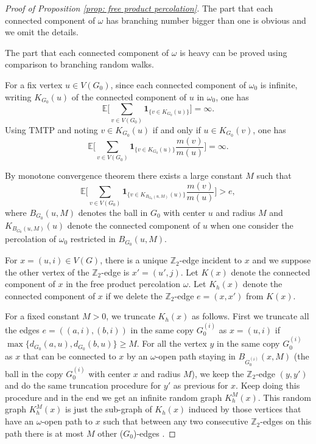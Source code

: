 \documentclass[12pt]{article}
\numberwithin{equation}{section}
\newcommand{\be}{\begin{equation}}
\newcommand{\ee}{\end{equation}}
\newcommand{\1}{\mathbf{1}}
\begin{document}
\begin{proof}[Proof of Proposition \ref{prop: free product percolation}]
	The part that each connected component of $\omega$ has branching number bigger than one is obvious and we omit the details. %
	
	The part that each connected component of $\omega$ is heavy can be proved using comparison to branching random walks. 
	
	
	For a fix vertex $u\in V(G_0)$, since each connected component of $\omega_0$ is infinite, writing $K_{G_0}(u)$ of the connected component of $u$ in $\omega_0$, one has 
	\[
	\mathbb{E}\Big[\sum_{v\in V(G_0)}\mathbf{1}_{  \{v\in K_{G_0}(u)\} }\Big]=\infty.
	\] 
	Using TMTP and noting $v\in K_{G_0}(u)$ if and only if $u\in K_{G_0}(v)$, one has 
	\be\label{eq: prop 6.2-1}
	\mathbb{E}\Big[\sum_{v\in V(G_0)} \mathbf{1}_{  \{v\in K_{G_0}(u)\}}\frac{m(v)}{m(u)} \Big]=\infty. 
	\ee
	
	
	By monotone convergence theorem there exists a large constant $M$ such that 
	\be\label{eq: prop 6.2-2}
		\mathbb{E}\Big[\sum_{v\in V(G_0)} \mathbf{1}_{  \{v\in K_{B_{G_0}(u,M)}(u)\}}\frac{m(v)}{m(u)} \Big]>e,
	\ee
	where $B_{G_0}(u,M)$ denotes the ball in $G_0 $ with center $u$ and radius $M$ and $K_{B_{G_0}(u,M)}(u)$ denote the connected component of $u$ when one consider the percolation of $\omega_0$ restricted in $B_{G_0}(u,M)$. 
	
	For $x=(u,i)\in V(G)$, there is a unique $\mathbb{Z}_2$-edge incident to $x$ and we suppose the other vertex of the $\mathbb{Z}_2$-edge is $x'=(u',j)$. Let $K(x)$ denote the connected component of $x$ in the free product percolation $\omega$. Let $K_h(x)$ denote the connected component of $x$ if we delete the $\mathbb{Z}_2$-edge $e=(x,x')$ from $K(x)$. %
	
	For a fixed constant $M>0$, we truncate $K_h(x)$ as follows. First we truncate all the edges $e=((a,i),(b,i))$ in the same copy $G_0^{(i)}$ as $x=(u,i)$ if $\max\{d_{G_0}(a,u),d_{G_0}(b,u) \}\geq M$. For all the vertex $y$ in the same copy $G_0^{(i)}$  as $x$ that can be connected to $x$ by an $\omega$-open path staying in $B_{G_0^{(i)}}(x,M)$ (the ball in the copy $G_0^{(i)}$  with center $x$ and radius $M$), we keep the $\mathbb{Z}_2$-edge $(y,y')$ and do the same truncation procedure for $y'$ as previous for $x$. Keep doing this procedure and in the end we get an infinite random graph $K_h^M(x)$. This random graph $K_h^M(x)$ is just the sub-graph of $K_h(x)$ induced by those vertices that have an $\omega$-open path to $x$  such  that between any two consecutive $\mathbb{Z}_2$-edges on this path there is at most $M$ other ($G_0$)-edges .
	


\end{proof}
\end{document}
